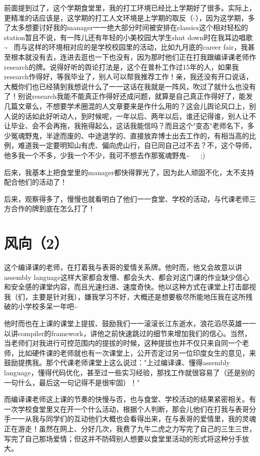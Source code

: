 \documentclass[12pt]{book}
\begin{document}
前面提到过了，这个学期食堂里，我的打工环境已经比上学期好了很多。实际上，更精准的话应该是，这学期的打工人文环境是上学期的取反（-），因为这学期，多了太多想要讨好我的manager一一绝大部分时间被安排在classics这个相对轻松的station暂且不说，有一阵儿还有年轻的小美校园大学生shut down时在我耳边唱歌\textasciitilde{}~ 而与这样的环境相对应的是学校校园里的活动，比如九月底的career fair，我甚至根本就没有去，连进去逛也一下也没有，因为那时他们正在打我跟编译课老师作research的牌。说得好听的舆论打法是，这个在普朴工作过15年的人，如果我research作得好，等我毕业了，别人可以帮我推荐工作！亲，我还没有开口说话，大概你们也已经猜到我想说什么了一一这话在我就是一阵风，吹过了就什么也没有了！别说research我能不能真正作得好还成问题，就算是自己真正作得好了，能发几篇文章么，不想要学术圈混的人文章要来是作什么用的？这会儿舆论风口上，别人说的话如此好听动人，到时候呢，一年以后、两年以后，谁还记得谁，别人让不让毕业、会不会再拖，我拖得起么，这话我能信吗？而且这个"变态"老师名下，多少冤魂野鬼，半途而废的、中途退学的、直接放弃博士出去工作的，有相当高的比例，难道我一定要明知山有虎、偏向虎山行，自已同自己过不去？不，这个导师，他多我一个不多，少我一个不少，我可不想去作那冤魂野鬼\textasciitilde{}~　;)

后来，我基本上把食堂里的manager都快得罪光了，因为此人顽固不化，太不支持配合他们的活动了！

后来，观察得多了，慢慢也就看明白了他们一一食堂、学校的活动，与代课老师三方合作的牌到底在怎么打了！

\section{风向（2）}
\label{sec-50-2}

这个编译课的老师，在打着我与表哥的爱情关系牌。他时而，他又会故意以讲assembly language这样大家都会发懵、都会头大、都会对这门课的作业缺少信心和安全感的课堂内容，而且光速扫进、速度奇快。他以这种方式在课堂上打击鄙视我（们，主要是针对我），嫌我学习不好，大概还是想要极尽所能地压我在这所残破的小学校多呆一年吧\textasciitilde{}~

他时而也在上课的课堂上提拔、鼓励我们一一滚滚长江东逝水，浪花滔尽英雄一一以讲compiler的framework，讲他之前快速跳过的细节来增加我们的信心。当然，当老师们对我进行可控范围内的提拔的时候，这种提拔也并不仅只来自同一个老师，比如硬件课的老师就也有一次课堂上，公开否定过另一位印度女生的意见，来鼓励提携我。那个代课老师课堂上这么说过："上过编译课、懂得assembly language，懂得代码优化，甚至过一些实习经验，那找工作就很容易了（还是别的一句什么，最后这一句记得不是很牢固）！"

而编译课老师这上课的节奏的快慢与否，也与食堂、学校活动的结果紧密相关。有一次学校食堂里又在开一个什么活动，根据个人判断，那会儿他们在打我与表哥分手一一从我与同学们的互动他们大概也会看得出来，在与表哥的爱情里，我的灵魂正在游走！虽然在网上、分好几次，我费了九牛二虎之力写完了自己的三生三世，写完了自己那场爱情；但这并不防碍别人想要以食堂里活动的形式将这种分手放大。
\end{document}
